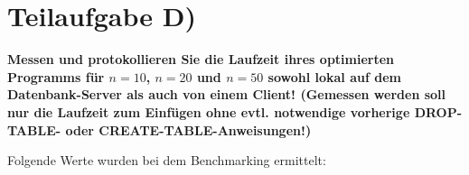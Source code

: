 \section{Teilaufgabe D)}
\textbf{Messen und protokollieren Sie die Laufzeit ihres optimierten Programms
für $n=10$, $n=20$ und $n=50$ sowohl lokal auf dem Datenbank-Server als auch von
einem  Client! (Gemessen werden soll nur die Laufzeit zum Einfügen
ohne evtl. notwendige vorherige DROP-TABLE- oder CREATE-TABLE-Anweisungen!)}

Folgende Werte wurden bei dem Benchmarking ermittelt:


